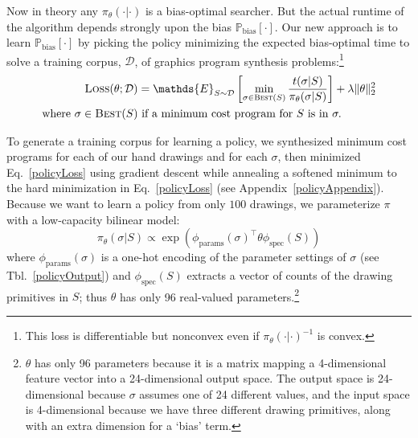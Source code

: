 \documentclass{article}
\newcommand{\expect}{\mathds{E}} %
\newcommand{\probability}{\mathds{P}} %
\theoremstyle{definition}
\begin{document}
Now in theory any $\pi_\theta(\cdot |\cdot ) $ is a bias-optimal searcher.
But the actual runtime of the algorithm depends strongly upon
the bias $\probability_{\text{bias}}[\cdot ]$.
Our new approach is to learn $\probability_{\text{bias}}[\cdot ]$
by picking the policy minimizing the
expected bias-optimal time to solve a training corpus, $\mathcal{D}$, of graphics program synthesis problems:\footnote{This loss is differentiable but nonconvex even if $\pi_{\theta}(\cdot |\cdot )^{-1}$ is convex.}
\begin{align}
\textsc{Loss}(\theta ; \mathcal{D})& =  \expect_{S\sim\mathcal{D}}\left[ \min_{\sigma\in \text{\textsc{Best}}(S)}\frac{t(\sigma | S)}{\pi_\theta (\sigma | S)}\right] + \lambda \Vert\theta\Vert_2^2\label{policyLoss}\\
\text{where }  \sigma \in\text{\textsc{Best}}(S) &\text{ if  a minimum cost program for }S \text{ is in }\sigma .\nonumber %
\end{align}

To generate a training corpus for learning a policy,
we synthesized minimum cost programs for each of our hand drawings
and for each $\sigma $,
then minimized Eq.~\ref{policyLoss} using gradient descent while annealing a softened minimum to the hard minimization in Eq.~\ref{policyLoss} (see Appendix~\ref{policyAppendix}).
Because we want to learn a policy from only $100$ drawings,
we parameterize $\pi$ with a  low-capacity bilinear model:
\begin{equation}
  \pi_{\theta}(\sigma |S)\propto \exp \left( \phi_{\text{params}}(\sigma )^\top\theta \phi_{\text{spec}}(S)\right)
\end{equation}
where $\phi_{\text{params}}(\sigma  )$ is a one-hot encoding of
the parameter settings of $\sigma $ (see Tbl.~\ref{policyOutput})
and $\phi_{\text{spec}}(S)$ extracts a vector of counts of the drawing primitives in $S$;
thus $\theta$ has only 96 real-valued parameters.\footnote{$\theta$ has only 96 parameters because it
  is a matrix mapping a 4-dimensional feature vector into a 24-dimensional output space.
  The output space is 24-dimensional because $\sigma $ assumes one of 24 different values,
  and the input space is 4-dimensional because we have three different drawing primitives,
along with an extra dimension for a `bias' term.}
\end{document}
